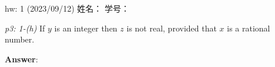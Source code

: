 \documentclass[UTF8,11pt,a4paper]{ctexart}
\begin{document}
	

\begin{center}
hw: 1 (2023/09/12) \qquad 姓名：  \hspace{4em}  学号： \hspace{4em} 
\end{center}



\emph{p3: 1-(h)} \qquad
If $y$ is an integer then $z$ is not real, provided that $x$ is a rational number.



\textbf{Answer}:










\end{document}
